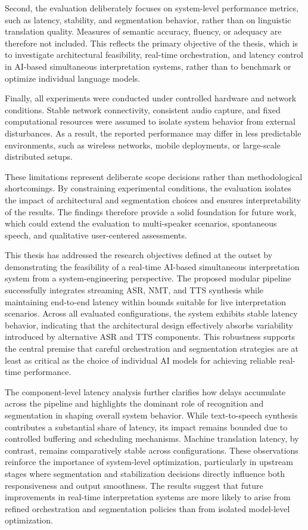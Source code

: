 Second, the evaluation deliberately focuses on system-level performance metrics, such as latency, stability, and segmentation behavior, rather than on linguistic translation quality. Measures of semantic accuracy, fluency, or adequacy are therefore not included. This reflects the primary objective of the thesis, which is to investigate architectural feasibility, real-time orchestration, and latency control in AI-based simultaneous interpretation systems, rather than to benchmark or optimize individual language models.

Finally, all experiments were conducted under controlled hardware and network conditions. Stable network connectivity, consistent audio capture, and fixed computational resources were assumed to isolate system behavior from external disturbances. As a result, the reported performance may differ in less predictable environments, such as wireless networks, mobile deployments, or large-scale distributed setups.

These limitations represent deliberate scope decisions rather than methodological shortcomings. By constraining experimental conditions, the evaluation isolates the impact of architectural and segmentation choices and ensures interpretability of the results. The findings therefore provide a solid foundation for future work, which could extend the evaluation to multi-speaker scenarios, spontaneous speech, and qualitative user-centered assessments.

\noindent
This thesis has addressed the research objectives defined at the outset by demonstrating the feasibility of a real-time AI-based simultaneous interpretation system from a system-engineering perspective. The proposed modular pipeline successfully integrates streaming ASR, NMT, and TTS synthesis while maintaining end-to-end latency within bounds suitable for live interpretation scenarios. Across all evaluated configurations, the system exhibits stable latency behavior, indicating that the architectural design effectively absorbs variability introduced by alternative ASR and TTS components. This robustness supports the central premise that careful orchestration and segmentation strategies are at least as critical as the choice of individual AI models for achieving reliable real-time performance.

The component-level latency analysis further clarifies how delays accumulate across the pipeline and highlights the dominant role of recognition and segmentation in shaping overall system behavior. While text-to-speech synthesis contributes a substantial share of latency, its impact remains bounded due to controlled buffering and scheduling mechanisms. Machine translation latency, by contrast, remains comparatively stable across configurations. These observations reinforce the importance of system-level optimization, particularly in upstream stages where segmentation and stabilization decisions directly influence both responsiveness and output smoothness. The results suggest that future improvements in real-time interpretation systems are more likely to arise from refined orchestration and segmentation policies than from isolated model-level optimization.

